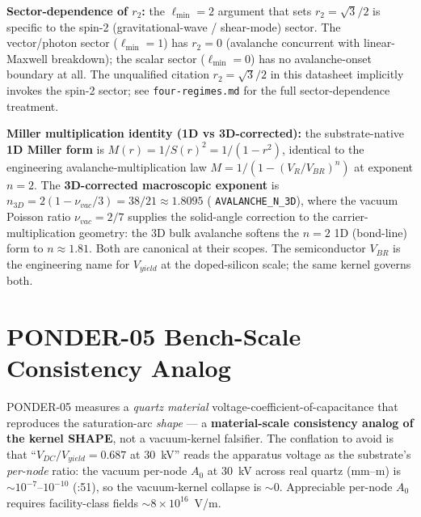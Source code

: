 \noindent
\textbf{Sector-dependence of $r_2$:} the $\ell_{\min} = 2$ argument that sets $r_2 = \sqrt{3}/2$ is specific to the spin-2 (gravitational-wave / shear-mode) sector. The vector/photon sector ($\ell_{\min} = 1$) has $r_2 = 0$ (avalanche concurrent with linear-Maxwell breakdown); the scalar sector ($\ell_{\min} = 0$) has no avalanche-onset boundary at all. The unqualified citation $r_2 = \sqrt{3}/2$ in this datasheet implicitly invokes the spin-2 sector; see \texttt{four-regimes.md} for the full sector-dependence treatment.

\noindent
\textbf{Miller multiplication identity (1D vs 3D-corrected):} the substrate-native \textbf{1D Miller form} is $M(r) = 1/S(r)^2 = 1/(1 - r^2)$, identical to the engineering avalanche-multiplication law $M = 1/(1 - (V_R/V_{BR})^n)$ at exponent $n = 2$. The \textbf{3D-corrected macroscopic exponent} is $n_{3D} = 2(1 - \nu_{vac}/3) = 38/21 \approx 1.8095$ ( \texttt{AVALANCHE\_N\_3D}), where the vacuum Poisson ratio $\nu_{vac} = 2/7$ supplies the solid-angle correction to the carrier-multiplication geometry: the 3D bulk avalanche softens the $n=2$ 1D (bond-line) form to $n \approx 1.81$. Both are canonical at their scopes. The semiconductor $V_{BR}$ is the engineering name for $V_{yield}$ at the doped-silicon scale; the same kernel governs both.

\section{PONDER-05 Bench-Scale Consistency Analog}
\label{sec:vol9_ponder_05}

\begin{warningbox}
PONDER-05 measures a \emph{quartz material} voltage-coefficient-of-capacitance that reproduces the saturation-arc \emph{shape} --- a \textbf{material-scale consistency analog of the kernel SHAPE}, not a vacuum-kernel falsifier. The conflation to avoid is that ``$V_{DC}/V_{yield}=0.687$ at \qty{30}{\kilo\volt}'' reads the apparatus voltage as the substrate's \emph{per-node} ratio: the vacuum per-node $A_0$ at \qty{30}{\kilo\volt} across real quartz (mm--\textmu m) is $\sim 10^{-7}$--$10^{-10}$ (:51), so the vacuum-kernel collapse is $\sim 0$. Appreciable per-node $A_0$ requires facility-class fields $\sim 8\times10^{16}$~V/m.
\end{warningbox}

